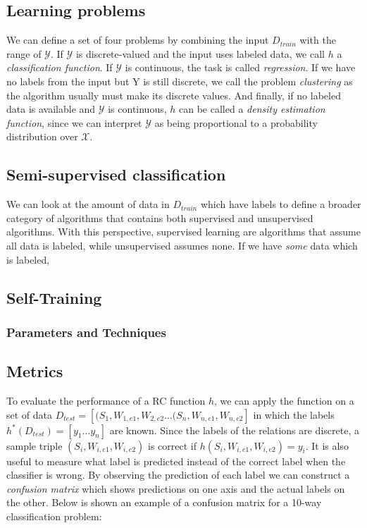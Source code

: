 \subsection{Learning problems}

We can define a set of four problems by combining the input $D_{train}$ with the range of $\mathcal{Y}$. If $\mathcal{Y}$ is discrete-valued and the input uses labeled data, we call $h$ a \emph{classification function}. If $\mathcal{Y}$ is continuous, the task is called \emph{regression}. If we have no labels from the input but Y is still discrete, we call the problem \emph{clustering} as the algorithm usually must make its discrete values. And finally, if no labeled data is available and $\mathcal{Y}$ is continuous, $h$ can be called a \emph{density estimation function}, since we can interpret $\mathcal{Y}$ as being proportional to a probability distribution over $\mathcal{X}$.

\subsection{Semi-supervised classification}

We can look at the amount of data in $D_{train}$ which have labels to define a broader category of algorithms that contains both supervised and unsupervised algorithms. With this perspective, supervised learning are algorithms that assume all data is labeled, while unsupervised assumes none. If we have \emph{some} data which is labeled,    

\subsection{Self-Training}

\subsubsection{Parameters and Techniques}

\subsection{Metrics}
\label{sec:metrics}

To evaluate the performance of a RC function $h$, we can apply the function on a set of data $D_{test} = [(S_1, W_{1,e1}, W_{2,e2} \ldots (S_n, W_{n,e1}, W_{n,e2}]$ in which the labels $h^*(D_{test}) = [y_1 \ldots y_n]$ are known. Since the labels of the relations are discrete, a sample triple $(S_i,W_{i,e1},W_{i,e2})$ is correct if $h(S_i,W_{i,e1},W_{i,e2}) = y_i$. 
It is also useful to measure what label is predicted instead of the correct label when the classifier is wrong.
By observing the prediction of each label we can construct a \emph{confusion matrix} which shows predictions on one axis and the actual labels on the other. Below is shown an example of a confusion matrix for a 10-way classification problem:

